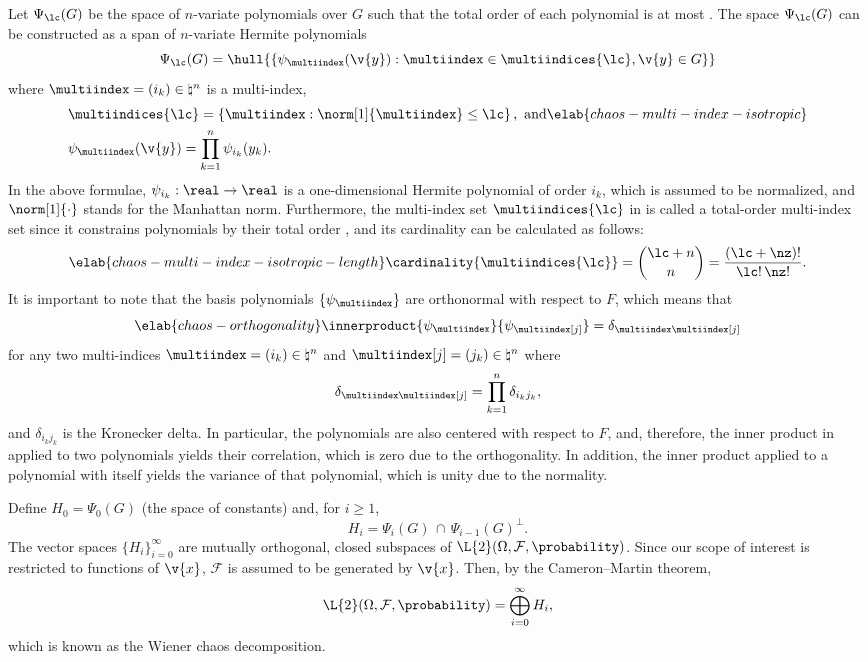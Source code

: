 Let $\Psi_\lc(G)$ be the space of $n$-variate polynomials over $G$ such that the
total order of each polynomial is at most \lc. The space $\Psi_\lc(G)$ can be
constructed as a span of $n$-variate Hermite polynomials \cite{eldred2008,
maitre2010}
\[
  \Psi_\lc(G) = \hull{\left\{ \psi_{\multiindex}(\v{y}): \multiindex \in \multiindices{\lc}, \v{y} \in G \right\}}
\]
where $\multiindex = (i_k) \in \natural^n$ is a multi-index,
\begin{align}
  & \multiindices{\lc} = \left\{ \multiindex: \norm[1]{\multiindex} \leq \lc \right\}, \text{ and} \elab{chaos-multi-index-isotropic} \\
  & \psi_{\multiindex}(\v{y}) = \prod_{k = 1}^n \psi_{i_k}(y_k). \nonumber
\end{align}
In the above formulae, $\psi_{i_k}: \real \to \real$ is a one-dimensional
Hermite polynomial of order $i_k$, which is assumed to be normalized, and
$\norm[1]{\cdot}$ stands for the Manhattan norm. Furthermore, the multi-index
set $\multiindices{\lc}$ in  is called a
total-order multi-index set since it constrains polynomials by their total order
\cite{eldred2008, beck2011}, and its cardinality can be calculated as follows:
\begin{equation} \elab{chaos-multi-index-isotropic-length}
  \cardinality{\multiindices{\lc}} = {\lc + n \choose n} = \frac{(\lc + \nz)!}{\lc! \, \nz!}.
\end{equation}
It is important to note that the basis polynomials $\{ \psi_{\multiindex} \}$
are orthonormal with respect to $F$, which means that
\begin{equation} \elab{chaos-orthogonality}
  \innerproduct{\psi_{\multiindex}}{\psi_{\multiindex[j]}} = \delta_{\multiindex \multiindex[j]}
\end{equation}
for any two multi-indices $\multiindex = (i_k) \in \natural^n$ and
$\multiindex[j] = (j_k) \in \natural^n$ where
\[
  \delta_{\multiindex \multiindex[j]} = \prod_{k = 1}^n \delta_{i_k j_k},
\]
and $\delta_{i_k j_k}$ is the Kronecker delta. In particular, the polynomials
are also centered with respect to $F$, and, therefore, the inner product in
 applied to two polynomials yields their correlation,
which is zero due to the orthogonality. In addition, the inner product applied
to a polynomial with itself yields the variance of that polynomial, which is
unity due to the normality.

Define $H_0 = \Psi_0(G)$ (the space of constants) and, for $i \geq 1$,
\[
  H_i = \Psi_i(G) \, \cap \, \Psi_{i - 1}(G)^\perp.
\]
The vector spaces $\{ H_i \}_{i = 0}^\infty$ are mutually orthogonal, closed
subspaces of $\L{2}(\Omega, \mathcal{F}, \probability)$. Since our scope of
interest is restricted to functions of $\v{x}$, $\mathcal{F}$ is assumed to be
generated by $\v{x}$. Then, by the Cameron--Martin theorem,
\[
  \L{2}(\Omega, \mathcal{F}, \probability) = \bigoplus_{i = 0}^\infty H_i,
\]
which is known as the Wiener chaos decomposition.

